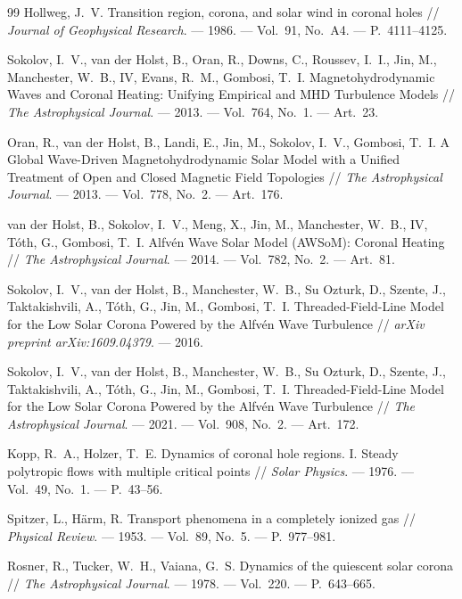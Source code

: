 \documentclass[11pt,a4paper]{article}
\begin{document}
\begin{thebibliography}{99}
Hollweg, J.~V. Transition region, corona, and solar wind in coronal holes // \emph{Journal of Geophysical Research}. --- 1986. --- Vol.~91, No.~A4. --- P.~4111--4125.

Sokolov, I.~V., van der Holst, B., Oran, R., Downs, C., Roussev, I.~I., Jin, M., Manchester, W.~B., IV, Evans, R.~M., Gombosi, T.~I. Magnetohydrodynamic Waves and Coronal Heating: Unifying Empirical and MHD Turbulence Models // \emph{The Astrophysical Journal}. --- 2013. --- Vol.~764, No.~1. --- Art.~23.

Oran, R., van der Holst, B., Landi, E., Jin, M., Sokolov, I.~V., Gombosi, T.~I. A Global Wave-Driven Magnetohydrodynamic Solar Model with a Unified Treatment of Open and Closed Magnetic Field Topologies // \emph{The Astrophysical Journal}. --- 2013. --- Vol.~778, No.~2. --- Art.~176.

van der Holst, B., Sokolov, I.~V., Meng, X., Jin, M., Manchester, W.~B., IV, T\'oth, G., Gombosi, T.~I. Alfv\'en Wave Solar Model (AWSoM): Coronal Heating // \emph{The Astrophysical Journal}. --- 2014. --- Vol.~782, No.~2. --- Art.~81.

Sokolov, I.~V., van der Holst, B., Manchester, W.~B., Su Ozturk, D., Szente, J., Taktakishvili, A., T\'oth, G., Jin, M., Gombosi, T.~I. Threaded-Field-Line Model for the Low Solar Corona Powered by the Alfv\'en Wave Turbulence // \emph{arXiv preprint arXiv:1609.04379}. --- 2016.

Sokolov, I.~V., van der Holst, B., Manchester, W.~B., Su Ozturk, D., Szente, J., Taktakishvili, A., T\'oth, G., Jin, M., Gombosi, T.~I. Threaded-Field-Line Model for the Low Solar Corona Powered by the Alfv\'en Wave Turbulence // \emph{The Astrophysical Journal}. --- 2021. --- Vol.~908, No.~2. --- Art.~172.

Kopp, R.~A., Holzer, T.~E. Dynamics of coronal hole regions. I. Steady polytropic flows with multiple critical points // \emph{Solar Physics}. --- 1976. --- Vol.~49, No.~1. --- P.~43--56.

Spitzer, L., H\"arm, R. Transport phenomena in a completely ionized gas // \emph{Physical Review}. --- 1953. --- Vol.~89, No.~5. --- P.~977--981.

Rosner, R., Tucker, W.~H., Vaiana, G.~S. Dynamics of the quiescent solar corona // \emph{The Astrophysical Journal}. --- 1978. --- Vol.~220. --- P.~643--665.


\end{thebibliography}
\end{document}
